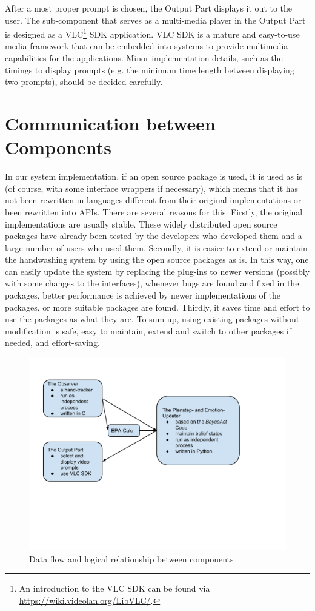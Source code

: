 After a most proper prompt is chosen, the Output Part displays it out to the user. The sub-component that serves as a multi-media player in the Output Part is designed as a VLC\footnote{An introduction to the VLC SDK can be found via \url{https://wiki.videolan.org/LibVLC/}.} SDK application. VLC SDK is a mature and easy-to-use media framework that can be embedded into systems to provide multimedia capabilities for the applications. Minor implementation details, such as the timings to display prompts (e.g. the minimum time length between displaying two prompts), should be decided carefully.

\section{Communication between Components}
\label{sec:design-commu}

In our system implementation, if an open source package is used, it is used as is (of course, with some interface wrappers if necessary), which means that it has not been rewritten in languages different from their original implementations or been rewritten into APIs. There are several reasons for this. Firstly, the original implementations are usually stable. These widely distributed open source packages have already been tested by the developers who developed them and a large number of users who used them. Secondly, it is easier to extend or maintain the handwashing system by using the open source packages as is. In this way, one can easily update the system by replacing the plug-ins to newer versions (possibly with some changes to the interfaces), whenever bugs are found and fixed in the packages, better performance is achieved by newer implementations of the packages, or more suitable packages are found. Thirdly, it saves time and effort to use the packages as what they are. To sum up, using existing packages without modification is safe, easy to maintain, extend and switch to other packages if needed, and effort-saving.

\begin{figure}[htp]
\centering
\includegraphics[trim = 10mm 63mm 37mm 20mm, clip, width=0.9\linewidth]{fig/fig-dataflow.pdf}
\caption{Data flow and logical relationship between components}
\label{fig:dataflow}
\end{figure}



